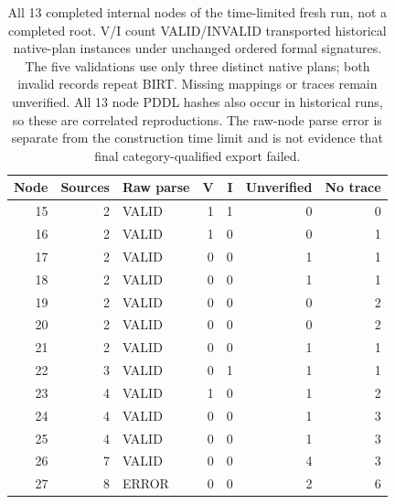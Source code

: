 \begin{table}[t]
\centering
\small
\begin{tabular}{rrlrrrr}
\toprule
Node & Sources & Raw parse & V & I & Unverified & No trace \\
\midrule
15 & 2 & VALID & 1 & 1 & 0 & 0 \\
16 & 2 & VALID & 1 & 0 & 0 & 1 \\
17 & 2 & VALID & 0 & 0 & 1 & 1 \\
18 & 2 & VALID & 0 & 0 & 1 & 1 \\
19 & 2 & VALID & 0 & 0 & 0 & 2 \\
20 & 2 & VALID & 0 & 0 & 0 & 2 \\
21 & 2 & VALID & 0 & 0 & 1 & 1 \\
22 & 3 & VALID & 0 & 1 & 1 & 1 \\
23 & 4 & VALID & 1 & 0 & 1 & 2 \\
24 & 4 & VALID & 0 & 0 & 1 & 3 \\
25 & 4 & VALID & 0 & 0 & 1 & 3 \\
26 & 7 & VALID & 0 & 0 & 4 & 3 \\
27 & 8 & ERROR & 0 & 0 & 2 & 6 \\
\bottomrule
\end{tabular}
\caption{All 13 completed internal nodes of the time-limited fresh run, not a completed root. V/I count VALID/INVALID transported historical native-plan instances under unchanged ordered formal signatures. The five validations use only three distinct native plans; both invalid records repeat BIRT. Missing mappings or traces remain unverified. All 13 node PDDL hashes also occur in historical runs, so these are correlated reproductions. The raw-node parse error is separate from the construction time limit and is not evidence that final category-qualified export failed.}
\label{tab:intermediate-nodes-oct24}
\end{table}
